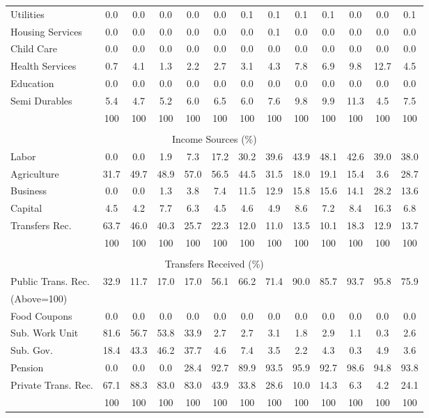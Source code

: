 \begin{tabular}{l c c c| c c c c c| c c c| c}
Utilities    & 0.0 & 0.0 & 0.0 & 0.0 & 0.0 & 0.1 & 0.1 & 0.1 & 0.1 & 0.0 & 0.0 & 0.1 \\
Housing Services  & 0.0 & 0.0 & 0.0 & 0.0 & 0.0 & 0.0 & 0.1 & 0.0 & 0.0 & 0.0 & 0.0 & 0.0 \\
Child Care   & 0.0 & 0.0 & 0.0 & 0.0 & 0.0 & 0.0 & 0.0 & 0.0 & 0.0 & 0.0 & 0.0 & 0.0 \\
Health Services    & 0.7 & 4.1 & 1.3 & 2.2 & 2.7 & 3.1 & 4.3 & 7.8 & 6.9 & 9.8 & 12.7 & 4.5 \\
Education   & 0.0 & 0.0 & 0.0 & 0.0 & 0.0 & 0.0 & 0.0 & 0.0 & 0.0 & 0.0 & 0.0 & 0.0 \\
Semi Durables     & 5.4 & 4.7 & 5.2 & 6.0 & 6.5 & 6.0 & 7.6 & 9.8 & 9.9 & 11.3 & 4.5 & 7.5 \\
\midrule
 & 100 & 100 & 100 & 100 & 100 & 100 & 100 & 100 & 100 & 100 & 100 & 100 \\
\midrule \\
\multicolumn{13}{c}{Income Sources (\%)}  \\
\midrule
Labor        & 0.0 & 0.0 & 1.9 & 7.3 & 17.2 & 30.2 & 39.6 & 43.9 & 48.1 & 42.6 & 39.0 & 38.0 \\
Agriculture  & 31.7 & 49.7 & 48.9 & 57.0 & 56.5 & 44.5 & 31.5 & 18.0 & 19.1 & 15.4 & 3.6 & 28.7 \\
Business     & 0.0 & 0.0 & 1.3 & 3.8 & 7.4 & 11.5 & 12.9 & 15.8 & 15.6 & 14.1 & 28.2 & 13.6 \\
Capital      & 4.5 & 4.2 & 7.7 & 6.3 & 4.5 & 4.6 & 4.9 & 8.6 & 7.2 & 8.4 & 16.3 & 6.8 \\
Transfers Rec.  & 63.7 & 46.0 & 40.3 & 25.7 & 22.3 & 12.0 & 11.0 & 13.5 & 10.1 & 18.3 & 12.9 & 13.7 \\
\midrule
 & 100 & 100 & 100 & 100 & 100 & 100 & 100 & 100 & 100 & 100 & 100 & 100 \\
\midrule \\
\multicolumn{13}{c}{Transfers Received (\%)}  \\
\midrule
Public Trans. Rec.  & 32.9 & 11.7 & 17.0 & 17.0 & 56.1 & 66.2 & 71.4 & 90.0 & 85.7 & 93.7 & 95.8 & 75.9 \\
(Above=100) & & & & & & & & & & & &  \\
\hspace{.3cm} Food Coupons    & 0.0 & 0.0 & 0.0 & 0.0 & 0.0 & 0.0 & 0.0 & 0.0 & 0.0 & 0.0 & 0.0 & 0.0 \\
\hspace{.3cm} Sub. Work Unit  & 81.6 & 56.7 & 53.8 & 33.9 & 2.7 & 2.7 & 3.1 & 1.8 & 2.9 & 1.1 & 0.3 & 2.6 \\
\hspace{.3cm} Sub. Gov.       & 18.4 & 43.3 & 46.2 & 37.7 & 4.6 & 7.4 & 3.5 & 2.2 & 4.3 & 0.3 & 4.9 & 3.6 \\
\hspace{.3cm} Pension         & 0.0 & 0.0 & 0.0 & 28.4 & 92.7 & 89.9 & 93.5 & 95.9 & 92.7 & 98.6 & 94.8 & 93.8 \\
Private Trans. Rec. & 67.1 & 88.3 & 83.0 & 83.0 & 43.9 & 33.8 & 28.6 & 10.0 & 14.3 & 6.3 & 4.2 & 24.1 \\
\midrule
 & 100 & 100 & 100 & 100 & 100 & 100 & 100 & 100 & 100 & 100 & 100 & 100 \\
\bottomrule
\end{tabular}